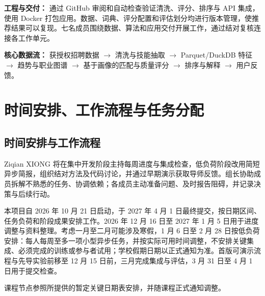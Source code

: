 \documentclass[a4paper,12pt]{article}
\begin{document}
\noindent\textbf{工程与交付：}
通过 GitHub 审阅和自动检查验证清洗、评分、排序与 API 集成，使用 Docker 打包应用。数据、词典、评分配置和评估划分均进行版本管理，使推荐结果可以复现。七名成员围绕数据、算法和应用交付开展工作，通过结对复核连接各工作单元。

\medskip
\noindent\textbf{核心数据流：}
获授权招聘数据 $\rightarrow$ 清洗与技能抽取 $\rightarrow$ Parquet/DuckDB 特征 $\rightarrow$ 趋势与职业图谱 $\rightarrow$ 基于画像的匹配与质量评分 $\rightarrow$ 排序与解释 $\rightarrow$ 用户反馈。

\newpage
\section{时间安排、工作流程与任务分配}
\subsection{时间安排与工作流程}
Ziqian XIONG 将在集中开发阶段主持每周进度与集成检查，低负荷阶段改用简短异步简报，组织结对方法及代码讨论，并通过早期演示获取导师反馈。组长协助成员拆解不熟悉的任务、协调依赖；各成员主动准备问题、及时报告阻碍，并记录决策与后续行动。

本项目自 2026 年 10 月 21 日启动，于 2027 年 4 月 1 日最终提交，按日期区间、任务负荷和阶段成果安排工作。2026 年 12 月 16 日至 2027 年 1 月 5 日用于进度调整与资料整理。考虑一月至二月可能涉及寒假，1 月 6 日至 2 月 28 日按低负荷安排：每人每周至多一项小型异步任务，并按实际可用时间调整，不安排关键集成、必须完成的训练或参与者试用；学校假期日期以正式通知为准。首版可演示流程与先导实验前移至 12 月 15 日前，三月完成集成与评估，3 月 31 日至 4 月 1 日用于提交检查。

课程节点参照所提供的暂定关键日期表安排，并随课程正式通知调整。
\end{document}
